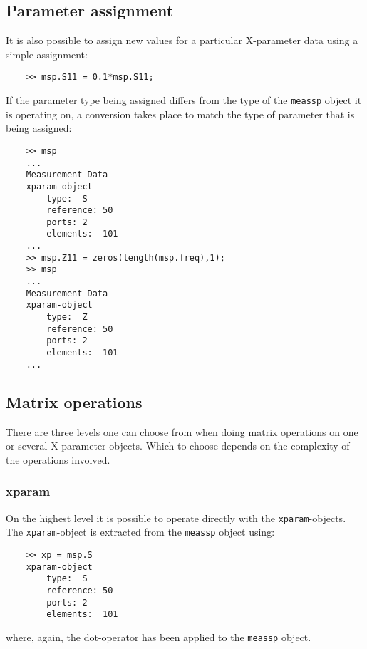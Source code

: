 \subsection{Parameter assignment}
It is also possible to assign new values for a particular
X-parameter data using a simple assignment:
\begin{small}
\begin{verbatim}
    >> msp.S11 = 0.1*msp.S11;
\end{verbatim}
\end{small}
If the parameter type being assigned differs from the type of the
\verb"meassp" object it is operating on, a conversion takes place
to match the type of parameter that is being assigned:
\begin{small}
\begin{verbatim}
    >> msp
    ...
    Measurement Data
    xparam-object
        type:  S
        reference: 50
        ports: 2
        elements:  101
    ...
    >> msp.Z11 = zeros(length(msp.freq),1);
    >> msp
    ...
    Measurement Data
    xparam-object
        type:  Z
        reference: 50
        ports: 2
        elements:  101
    ...
\end{verbatim}
\end{small}

\subsection{Matrix operations}
There are three levels one can choose from when doing matrix
operations on one or several X-parameter objects. Which to choose
depends on the complexity of the operations involved.

\subsubsection{xparam}
On the highest level it is possible to operate directly with the
\verb"xparam"-objects. The \verb"xparam"-object is extracted from
the \verb"meassp" object using:
\begin{small}
\begin{verbatim}
    >> xp = msp.S
    xparam-object
        type:  S
        reference: 50
        ports: 2
        elements:  101
\end{verbatim}
\end{small}
where, again, the dot-operator has been applied to the
\verb"meassp" object.

